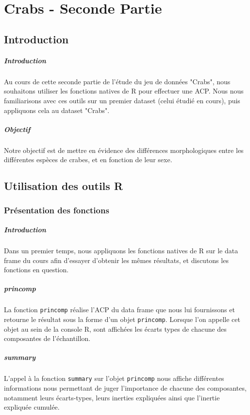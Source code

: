 \documentclass{report}
\begin{document}
\newpage
\chapter{Crabs - Seconde Partie}

\section{Introduction}
\paragraph{Introduction}
Au cours de cette seconde partie de l'étude du jeu de données "Crabs", nous souhaitons
utiliser les fonctions natives de R pour effectuer une ACP. Nous nous familiarisons avec ces outils sur un premier dataset (celui étudié en cours), puis appliquons cela au dataset "Crabs".
\paragraph{Objectif}
Notre objectif est de mettre en évidence des différences morphologiques entre les différentes espèces de crabes, et en fonction de leur sexe.

\section{Utilisation des outils R}
\subsection{Présentation des fonctions}
\paragraph{Introduction}
Dans un premier temps, nous appliquons les fonctions natives de R sur le data frame du cours afin d'essayer d'obtenir les mêmes résultats, et discutons les fonctions en question.
\paragraph{princomp}
La fonction \verb+princomp+ réalise l'ACP du data frame que nous lui fournissons et retourne le résultat sous la forme d'un objet \verb+princomp+. Lorsque l'on appelle cet objet au sein de la console R, sont affichées les écarts types de chacune des composantes de l'échantillon.
\paragraph{summary}
L'appel à la fonction \verb+summary+ sur l'objet \verb+princomp+ nous affiche différentes informations nous permettant de juger l'importance de chacune des composantes, notamment leurs écarts-types, leurs inerties expliquées ainsi que l'inertie expliquée cumulée.
\end{document}
